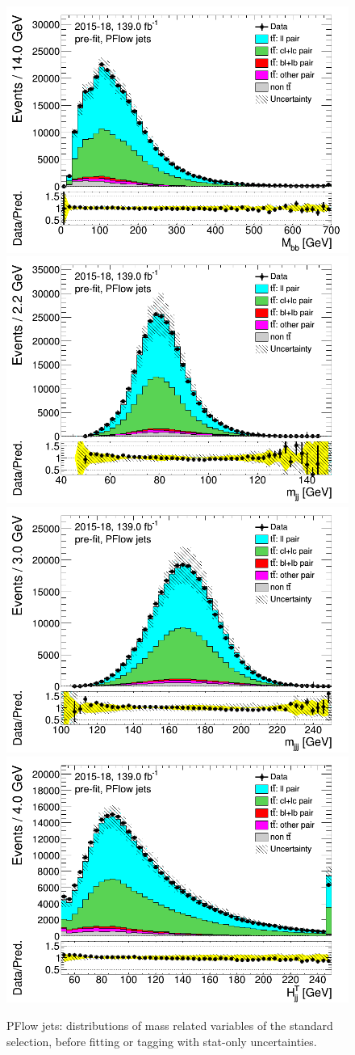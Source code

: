 \documentclass[letterpaper,12pt]{article}
\begin{document}
\newpage
\begin{figure}[H]
\includegraphics[width=.45\textwidth]{FTAG_plots/pretagNoRwwithouthighpTPFlowall/DataMC_h_Mbb.png}
\includegraphics[width=.45\textwidth]{FTAG_plots/pretagNoRwwithouthighpTPFlowall/DataMC_h_mjj.png}\\
\includegraphics[width=.45\textwidth]{FTAG_plots/pretagNoRwwithouthighpTPFlowall/DataMC_h_mjjj.png}
\includegraphics[width=.45\textwidth]{FTAG_plots/pretagNoRwwithouthighpTPFlowall/DataMC_h_Htjj.png}\\
\caption{PFlow jets: distributions of mass related variables of the standard selection, 
before fitting or 
tagging with stat-only uncertainties.} \label{fig:standard_mass_PFlow}
\end{figure}
\end{document}
